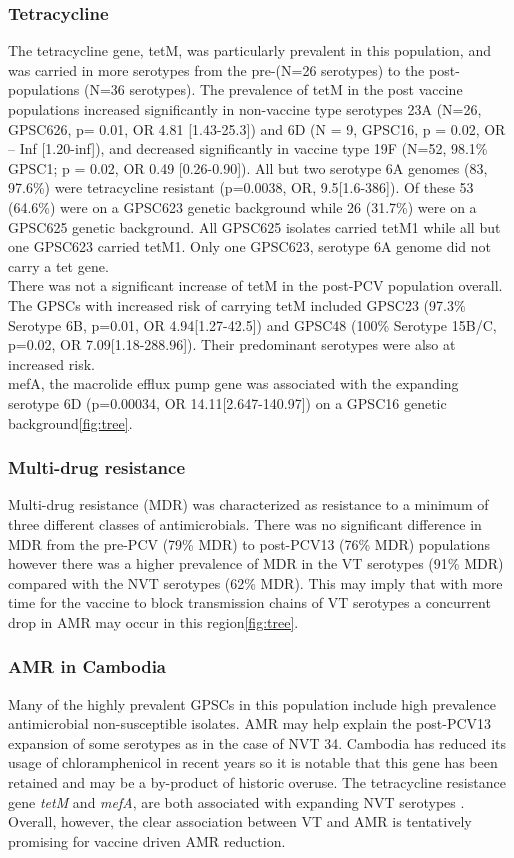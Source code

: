 \documentclass{article}
\begin{document}
\subsubsection{Tetracycline}
The tetracycline gene, tetM, was particularly prevalent in this population, and was carried in more serotypes from the pre-(N=26 serotypes) to the post-populations (N=36 serotypes). The prevalence of tetM in the post vaccine populations increased significantly in non-vaccine type serotypes 23A (N=26, GPSC626, p= 0.01, OR 4.81 [1.43-25.3]) and 6D (N = 9, GPSC16, p = 0.02, OR – Inf [1.20-inf]), and decreased significantly in vaccine type 19F (N=52, 98.1\% GPSC1; p = 0.02, OR 0.49 [0.26-0.90]). All but two serotype 6A genomes (83, 97.6\%) were tetracycline resistant (p=0.0038, OR, 9.5[1.6-386]). Of these 53 (64.6\%) were on a GPSC623 genetic background while 26 (31.7\%) were on a GPSC625 genetic background. All GPSC625 isolates carried tetM1 while all but one GPSC623 carried tetM1. Only one GPSC623, serotype 6A genome did not carry a tet gene. 
\\There was not a significant increase of tetM in the post-PCV population overall. The GPSCs with increased risk of carrying tetM included GPSC23 (97.3\% Serotype 6B, p=0.01, OR 4.94[1.27-42.5]) and GPSC48 (100\% Serotype 15B/C, p=0.02, OR 7.09[1.18-288.96]). Their predominant serotypes were also at increased risk. 
\\mefA, the macrolide efflux pump gene was associated with the expanding serotype 6D (p=0.00034, OR 14.11[2.647-140.97]) on a GPSC16 genetic background\ref{fig:tree}.
\subsubsection{Multi-drug resistance}
Multi-drug resistance (MDR) was characterized as resistance to a minimum of three different classes of antimicrobials. There was no significant difference in MDR from the pre-PCV (79\% MDR) to post-PCV13 (76\% MDR) populations however there was a higher prevalence of MDR in the VT serotypes (91\% MDR) compared with the NVT serotypes (62\% MDR). This may imply that with more time for the vaccine to block transmission chains of VT serotypes a concurrent drop in AMR may occur in this region\ref{fig:tree}. 
\subsubsection{AMR in Cambodia}
Many of the highly prevalent GPSCs in this population include high prevalence antimicrobial non-susceptible isolates. AMR may help explain the post-PCV13 expansion of some serotypes as in the case of NVT 34. Cambodia has reduced its usage of chloramphenicol in recent years so it is notable that this gene has been retained and may be a by-product of historic overuse. The tetracycline resistance gene \textit{tetM} and \textit{mefA}, are both associated with expanding NVT serotypes . Overall, however, the clear association between VT and AMR is tentatively promising for vaccine driven AMR reduction.
\end{document}
